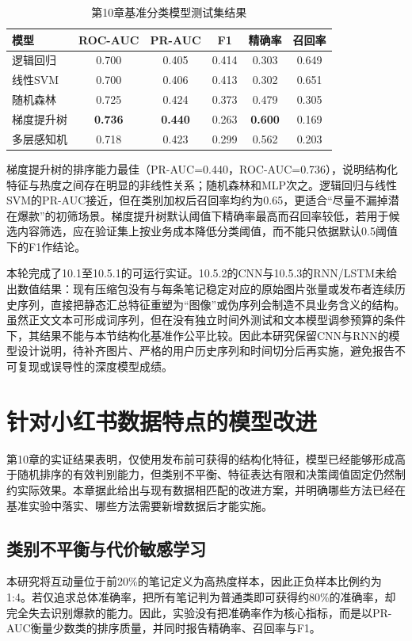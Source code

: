 \begin{table}[htbp]
\centering
\caption{第10章基准分类模型测试集结果}
\label{tab:chapter10-baselines}
\begin{tabular}{lccccc}
\toprule
模型 & ROC-AUC & PR-AUC & F1 & 精确率 & 召回率 \\
\midrule
逻辑回归 & 0.700 & 0.405 & 0.414 & 0.303 & 0.649 \\
线性SVM & 0.700 & 0.406 & 0.413 & 0.302 & 0.651 \\
随机森林 & 0.725 & 0.424 & 0.373 & 0.479 & 0.305 \\
梯度提升树 & \textbf{0.736} & \textbf{0.440} & 0.263 & \textbf{0.600} & 0.169 \\
多层感知机 & 0.718 & 0.423 & 0.299 & 0.562 & 0.203 \\
\bottomrule
\end{tabular}
\end{table}

梯度提升树的排序能力最佳（PR-AUC=0.440，ROC-AUC=0.736），说明结构化特征与热度之间存在明显的非线性关系；随机森林和MLP次之。逻辑回归与线性SVM的PR-AUC接近，但在类别加权后召回率均约为0.65，更适合“尽量不漏掉潜在爆款”的初筛场景。梯度提升树默认阈值下精确率最高而召回率较低，若用于候选内容筛选，应在验证集上按业务成本降低分类阈值，而不能只依据默认0.5阈值下的F1作结论。

本轮完成了10.1至10.5.1的可运行实证。10.5.2的CNN与10.5.3的RNN/LSTM未给出数值结果：现有压缩包没有与每条笔记稳定对应的原始图片张量或发布者连续历史序列，直接把静态汇总特征重塑为“图像”或伪序列会制造不具业务含义的结构。虽然正文文本可形成词序列，但在没有独立时间外测试和文本模型调参预算的条件下，其结果不能与本节结构化基准作公平比较。因此本研究保留CNN与RNN的模型设计说明，待补齐图片、严格的用户历史序列和时间切分后再实施，避免报告不可复现或误导性的深度模型成绩。

\chapter{针对小红书数据特点的模型改进}

第10章的实证结果表明，仅使用发布前可获得的结构化特征，模型已经能够形成高于随机排序的有效判别能力，但类别不平衡、特征表达有限和决策阈值固定仍然制约实际效果。本章据此给出与现有数据相匹配的改进方案，并明确哪些方法已经在基准实验中落实、哪些方法需要新增数据后才能实施。

\section{类别不平衡与代价敏感学习}
本研究将互动量位于前20\%的笔记定义为高热度样本，因此正负样本比例约为1:4。若仅追求总体准确率，把所有笔记判为普通类即可获得约80\%的准确率，却完全失去识别爆款的能力。因此，实验没有把准确率作为核心指标，而是以PR-AUC衡量少数类的排序质量，并同时报告精确率、召回率与F1。

